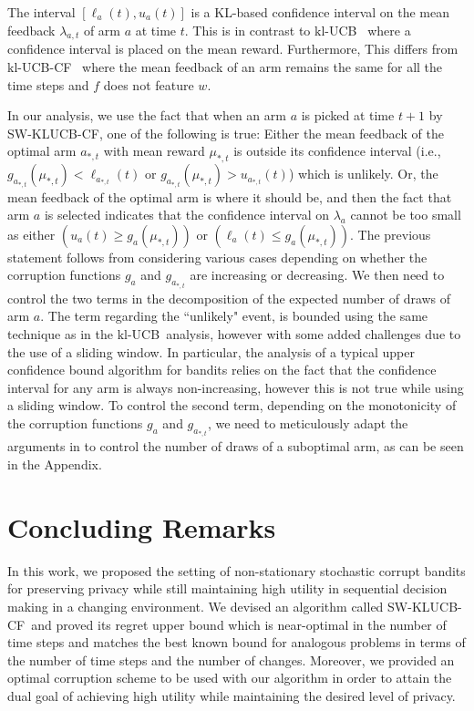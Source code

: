 \documentclass[letterpaper]{article} %
\newcommand{\KLUCBCF}{$\mathrm{kl}$-\textsc{UCB-CF}}
\newcommand{\SWKLUCBCF}{\textsc{SW-KLUCB-CF}}
\newcommand{\KLUCB}{$\mathrm{kl}$-\textsc{UCB}}
\newcommand{\optArm}[1]{a_{*, #1}}
\newcommand{\optMean}[1]{\mu_{*, #1}}
\newcommand{\meanFeedback}[2]{\lambda_{#1, #2}}
\newcommand{\windowsize}{w}
\begin{document}
The interval $[\ell_a(t), u_a(t)]$ is a KL-based confidence interval on the mean feedback $\meanFeedback{a}{t}$ of arm $a$ at time $t$. 
This is in contrast to \KLUCB\ \citep{KLUCBJournal} where a confidence interval is placed on the mean reward. Furthermore, 
This differs from \KLUCBCF \ \cite{pmlr-v83-gajane18a} where the mean feedback of an arm remains the same for all the time steps and $f$ does not feature $\windowsize$.

In our analysis, we use the fact that when an arm $a$ is picked at time $t+1$ by \SWKLUCBCF, one of the following is true:
    Either the mean feedback of the optimal arm $\optArm{t}$ with mean reward $\optMean{t}$ is outside its confidence interval (i.e., $g_{\optArm{t}}(\optMean{t}) < \ell_{\optArm{t}}(t)$ or $g_{\optArm{t}}(\optMean{t}) > u_{\optArm{t}}(t)$) which is unlikely. Or, 
    the mean feedback of the optimal arm is where it should be, and then the fact that arm $a$ is selected indicates that the confidence interval on $\lambda_a$ cannot be too small as either $(u_a(t) \geq g_a(\optMean{t}))$ or $(\ell_a(t) \leq g_a(\optMean{t}))$. 
The previous statement follows from considering various cases depending on whether the corruption functions $g_a$ and $g_{\optArm{t}}$ are increasing or decreasing. 
We then need to control the two terms in the decomposition of the expected number of draws of arm $a$. The term regarding the ``unlikely" event, is bounded using the same technique as in the \KLUCB \ analysis, however with some added challenges due to the use of a sliding window. In particular, the analysis of a typical upper confidence bound algorithm for bandits relies on the fact that the confidence interval for any arm is always non-increasing, however this is not true while using a sliding window. To control the second term, depending on the monotonicity of the corruption functions $g_a$ and $g_{\optArm{t}}$, we need to meticulously adapt the arguments in \citet{KLUCBJournal} to control the number of draws of a suboptimal arm, as can be seen in the Appendix. 

\section{Concluding Remarks}
In this work, we proposed the setting of non-stationary stochastic corrupt bandits for preserving privacy while still maintaining high utility in sequential decision making in a changing environment. We devised an algorithm called \SWKLUCBCF \ and proved its regret upper bound which is near-optimal in the number of time steps and matches the best known bound for analogous problems in terms of the number of time steps and the number of changes. Moreover, we provided an optimal corruption scheme to be used with our algorithm in order to attain the dual goal of achieving high utility while maintaining the desired level of privacy. 
\end{document}
